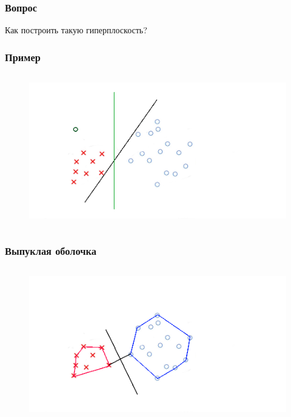 \documentclass[12pt]{beamer}
\begin{document}

\begin{frame}\frametitle{Вопрос}
Как построить такую гиперплоскость?
\end{frame}

\begin{frame}\frametitle{Пример}
\begin{figure}[htbp]
  \includegraphics[height=190pt, keepaspectratio = true]{images/example}   
\end{figure}
\end{frame}


\begin{frame}\frametitle{Выпуклая оболочка}
\begin{figure}[htbp]
  \includegraphics[height=190pt, keepaspectratio = true]{images/example1}   
\end{figure}
\end{frame}
\end{document}

